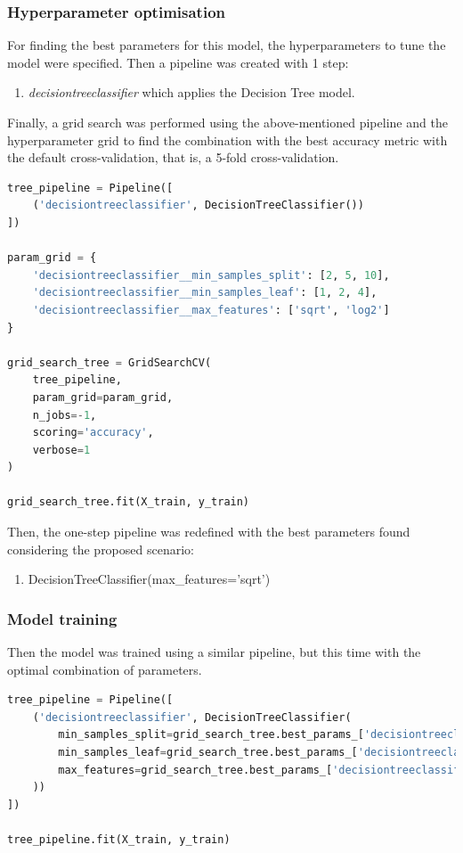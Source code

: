 \documentclass{article}
\begin{document}
\subsubsection{Hyperparameter optimisation}
For finding the best parameters for this model, the hyperparameters to tune the model were specified. Then a pipeline was created with 1 step:
\begin{enumerate}
\item \emph{decisiontreeclassifier} which applies the Decision Tree model.
\end{enumerate}

Finally, a grid search was performed using the above-mentioned pipeline and the hyperparameter grid to find the combination with the best accuracy metric with the default cross-validation, that is, a 5-fold cross-validation.
\begin{lstlisting}[language=Python]
tree_pipeline = Pipeline([
    ('decisiontreeclassifier', DecisionTreeClassifier())
])

param_grid = {
    'decisiontreeclassifier__min_samples_split': [2, 5, 10],
    'decisiontreeclassifier__min_samples_leaf': [1, 2, 4],
    'decisiontreeclassifier__max_features': ['sqrt', 'log2']
}

grid_search_tree = GridSearchCV(
    tree_pipeline,
    param_grid=param_grid,
    n_jobs=-1,
    scoring='accuracy',
    verbose=1
)

grid_search_tree.fit(X_train, y_train)
\end{lstlisting}

Then, the one-step pipeline was redefined with the best parameters found considering the proposed scenario:
\begin{enumerate}    
    \item DecisionTreeClassifier(max\_features='sqrt')
\end{enumerate}

\subsubsection{Model training}
Then the model was trained using a similar pipeline, but this time with the optimal combination of parameters.

\begin{lstlisting}[language=Python]
tree_pipeline = Pipeline([
    ('decisiontreeclassifier', DecisionTreeClassifier(
        min_samples_split=grid_search_tree.best_params_['decisiontreeclassifier__min_samples_split'],
        min_samples_leaf=grid_search_tree.best_params_['decisiontreeclassifier__min_samples_leaf'],
        max_features=grid_search_tree.best_params_['decisiontreeclassifier__max_features']
    ))
])

tree_pipeline.fit(X_train, y_train)
\end{lstlisting}
\end{document}
